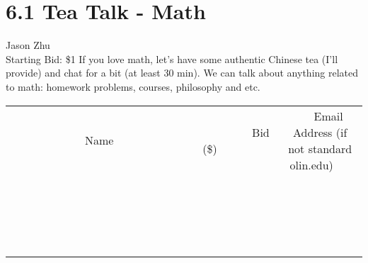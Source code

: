 \documentclass[11pt]{article}
\begin{document}
\section*{6.1 Tea Talk - Math}
Jason Zhu
\\
Starting Bid: \$1
\newline
If you love math, let's have some authentic Chinese tea (I'll provide) and chat for a bit (at least 30 min). We can talk about anything related to math: homework problems, courses, philosophy and etc.
\\[3ex]
\begin{tabular}{c c c}
~~~~~~~~~~~~~Name~~~~~~~~~~~~~ & ~~~~~~~~~Bid (\$)~~~~~~~~~  & ~~~Email Address (if not standard olin.edu)~~~\\
 & & \\
\hline
 & & \\
\hline
 & & \\
\hline
 & & \\
\hline
 & & \\
\hline
 & & \\
\hline
 & & \\
\hline
 & & \\
\hline
 & & \\
\hline
 & & \\
\hline
 & & \\
\hline
 & & \\
\hline
 & & \\
\hline
 & & \\
\hline
 & & \\
\hline
 & & \\
\hline
 & & \\
\hline
 & & \\
\hline
 & & \\
\hline
\end{tabular}
\newpage
\end{document}
